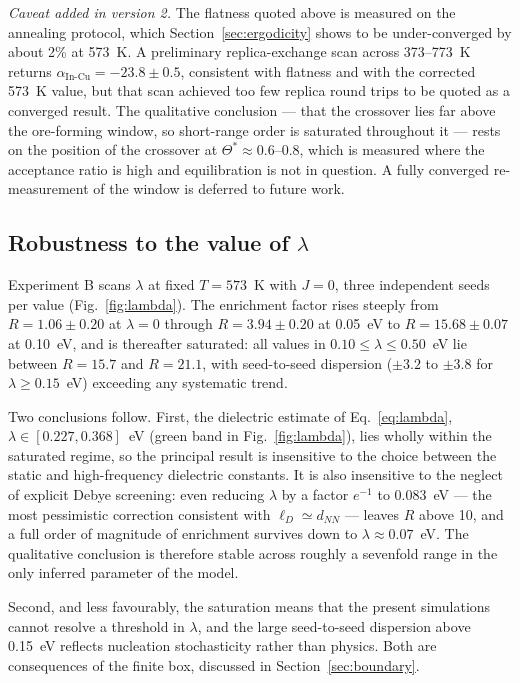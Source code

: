 \documentclass[11pt,a4paper]{article}
\newcommand{\aInCu}{\alpha_{\mathrm{In\text{-}Cu}}}
\begin{document}
\emph{Caveat added in version 2.} The flatness quoted above is measured on the
annealing protocol, which Section~\ref{sec:ergodicity} shows to be
under-converged by about 2\% at 573~K. A preliminary replica-exchange scan
across 373--773~K returns $\aInCu = -23.8 \pm 0.5$, consistent with flatness and
with the corrected 573~K value, but that scan achieved too few replica round
trips to be quoted as a converged result. The qualitative conclusion --- that the
crossover lies far above the ore-forming window, so short-range order is
saturated throughout it --- rests on the position of the crossover at
$\Theta^* \approx 0.6$--0.8, which is measured where the acceptance ratio is high
and equilibration is not in question. A fully converged re-measurement of the
window is deferred to future work.

\subsection{Robustness to the value of \texorpdfstring{$\lambda$}{lambda}}
\label{sec:lambdascan}

Experiment B scans $\lambda$ at fixed $T = 573$~K with $J = 0$, three
independent seeds per value (Fig.~\ref{fig:lambda}). The enrichment factor rises
steeply from $R = 1.06 \pm 0.20$ at $\lambda = 0$ through $R = 3.94 \pm 0.20$ at
0.05~eV to $R = 15.68 \pm 0.07$ at 0.10~eV, and is thereafter saturated: all
values in $0.10 \le \lambda \le 0.50$~eV lie between $R = 15.7$ and $R = 21.1$,
with seed-to-seed dispersion ($\pm 3.2$ to $\pm 3.8$ for
$\lambda \ge 0.15$~eV) exceeding any systematic trend.

Two conclusions follow. First, the dielectric estimate of Eq.~\eqref{eq:lambda},
$\lambda \in [0.227, 0.368]$~eV (green band in Fig.~\ref{fig:lambda}), lies
wholly within the saturated regime, so the principal result is insensitive to
the choice between the static and high-frequency dielectric constants. It is
also insensitive to the neglect of explicit Debye screening: even reducing
$\lambda$ by a factor $e^{-1}$ to 0.083~eV --- the most pessimistic correction
consistent with $\ell_D \simeq d_{NN}$ --- leaves $R$ above 10, and a full order
of magnitude of enrichment survives down to $\lambda \approx 0.07$~eV. The
qualitative conclusion is therefore stable across roughly a sevenfold range in
the only inferred parameter of the model.

Second, and less favourably, the saturation means that the present simulations
cannot resolve a threshold in $\lambda$, and the large seed-to-seed dispersion
above 0.15~eV reflects nucleation stochasticity rather than physics. Both are
consequences of the finite box, discussed in Section~\ref{sec:boundary}.
\end{document}
